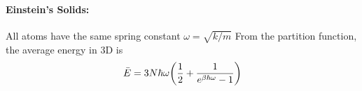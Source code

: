 \documentclass[../main.tex]{subfiles}
\begin{document}
\paragraph{Einstein's Solids:} All atoms have the same spring constant $\omega = \sqrt{k/m}$
From the partition function, the average energy in 3D is
\begin{align*}
    \bar E = 3N \hbar \omega \qt(
        \frac{1}{2} + \frac{1}{e^{\beta \hbar \omega} - 1}
    )
\end{align*}
\end{document}
